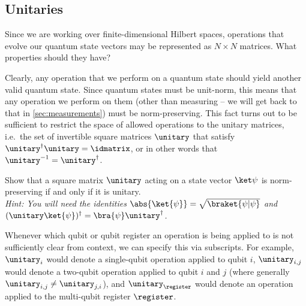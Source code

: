   \subsection{Unitaries}\label{sec:unitaries}
    Since we are working over finite-dimensional Hilbert spaces, 
      operations that evolve our quantum state vectors may be represented as 
      $N \times N$ matrices. What properties should they have?
    
    Clearly, any operation that we perform on a quantum state 
      should yield another valid quantum state. 
      Since quantum states must be unit-norm, this means
      that any operation we perform on them
      (other than measuring -- we will get back to that in
      \cref{sec:measurements}) 
      must be norm-preserving.
      This fact turns out to be sufficient
      to restrict the space of allowed operations to the unitary matrices,
      i.e.\ the set of invertible square matrices $\unitary$ that satisfy
      $\unitary^\dagger \unitary = \idmatrix$, or in other words that 
      $\unitary^{-1} = \unitary^\dagger$.

    \begin{exercise}\label{ex:unitarity}
      Show that a square matrix $\unitary$ acting on a state vector $\ket \psi$ is norm-preserving if
      and only if it is unitary.\\
      \emph{Hint: You will need the identities 
      $\abs{\ket{\psi}} = \sqrt{\braket{\psi|\psi}}$ 
      and $(\unitary \ket{\psi})^\dagger = \bra{\psi}\unitary^\dagger$.}
    \end{exercise}

    Whenever which qubit or qubit register
      an operation is being applied to is not sufficiently clear from context, 
      we can specify this via subscripts. For example, $\unitary_i$ would denote a
      single-qubit operation applied to qubit $i$, $\unitary_{i,j}$ would
      denote a two-qubit operation applied to qubit $i$ and $j$
      (where generally $\unitary_{i,j} \neq \unitary_{j,i}$), 
      and $\unitary_{\register}$ would denote an operation applied to
      the multi-qubit register $\register$.


